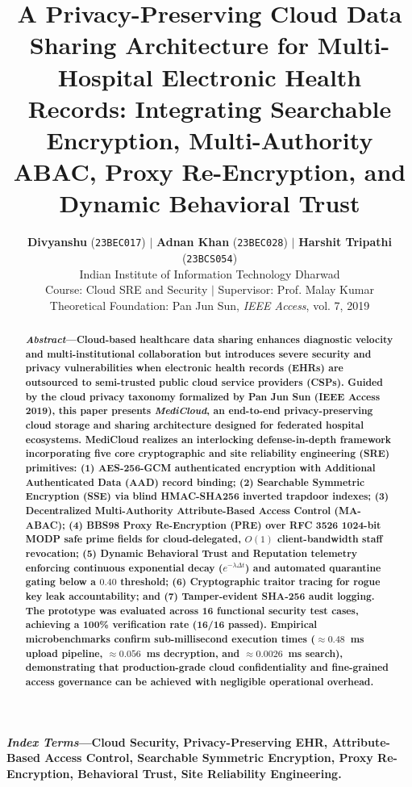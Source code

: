 \documentclass[10pt,twocolumn]{article}
\title{\vspace{-0.3in}\textbf{\Large A Privacy-Preserving Cloud Data Sharing Architecture for Multi-Hospital Electronic Health Records: Integrating Searchable Encryption, Multi-Authority ABAC, Proxy Re-Encryption, and Dynamic Behavioral Trust}}
\author{
  \textbf{Divyanshu} (\texttt{23BEC017}) \quad $\vert$ \quad
  \textbf{Adnan Khan} (\texttt{23BEC028}) \quad $\vert$ \quad
  \textbf{Harshit Tripathi} (\texttt{23BCS054})\\[3pt]
  \small Indian Institute of Information Technology Dharwad\\
  \small Course: Cloud SRE and Security \quad $\vert$ \quad Supervisor: Prof. Malay Kumar\\[1pt]
  \small Theoretical Foundation: Pan Jun Sun, \textit{IEEE Access}, vol. 7, 2019 \cite{sun2019privacy}
  \vspace{-0.15in}
}
\date{}
\begin{document}
\maketitle

\begin{abstract}
\textbf{\textit{Abstract}---Cloud-based healthcare data sharing enhances diagnostic velocity and multi-institutional collaboration but introduces severe security and privacy vulnerabilities when electronic health records (EHRs) are outsourced to semi-trusted public cloud service providers (CSPs). Guided by the cloud privacy taxonomy formalized by Pan Jun Sun (IEEE Access 2019), this paper presents \textit{MediCloud}, an end-to-end privacy-preserving cloud storage and sharing architecture designed for federated hospital ecosystems. MediCloud realizes an interlocking defense-in-depth framework incorporating five core cryptographic and site reliability engineering (SRE) primitives: (1) AES-256-GCM authenticated encryption with Additional Authenticated Data (AAD) record binding; (2) Searchable Symmetric Encryption (SSE) via blind HMAC-SHA256 inverted trapdoor indexes; (3) Decentralized Multi-Authority Attribute-Based Access Control (MA-ABAC); (4) BBS98 Proxy Re-Encryption (PRE) over RFC 3526 1024-bit MODP safe prime fields for cloud-delegated, $O(1)$ client-bandwidth staff revocation; (5) Dynamic Behavioral Trust and Reputation telemetry enforcing continuous exponential decay ($e^{-\lambda \Delta t}$) and automated quarantine gating below a $0.40$ threshold; (6) Cryptographic traitor tracing for rogue key leak accountability; and (7) Tamper-evident SHA-256 audit logging. The prototype was evaluated across 16 functional security test cases, achieving a 100\% verification rate (16/16 passed). Empirical microbenchmarks confirm sub-millisecond execution times ($\approx 0.48$~ms upload pipeline, $\approx 0.056$~ms decryption, and $\approx 0.0026$~ms search), demonstrating that production-grade cloud confidentiality and fine-grained access governance can be achieved with negligible operational overhead.}
\end{abstract}

\vspace{4pt}
\noindent\textbf{\textit{Index Terms}---Cloud Security, Privacy-Preserving EHR, Attribute-Based Access Control, Searchable Symmetric Encryption, Proxy Re-Encryption, Behavioral Trust, Site Reliability Engineering.}

\end{document}
